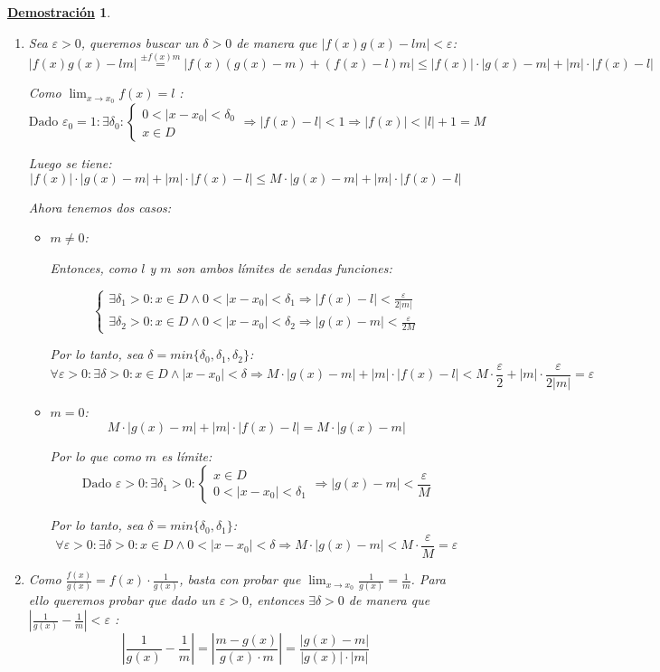 \documentclass[10pt,a4paper,openright]{book}
\theoremstyle{break}
\newtheorem*{demo}{\underline{Demostración}}
\begin{document}
\begin{demo}
\begin{enumerate}
\item Sea $\varepsilon>0$, queremos buscar un $\delta>0$ de manera que $|f(x)g(x)-lm|<\varepsilon$:
$$|f(x)g(x)-lm|\stackrel{\pm f(x)m}{=}|f(x)\left(g(x)-m\right)+\left(f(x)-l\right)m|\leq |f(x)|\cdot |g(x)-m|+|m|\cdot |f(x)-l|$$

Como $\lim_{x\rightarrow x_0}f(x)=l$ :
$$\mbox{Dado }\varepsilon_0=1: \exists \delta_0: \begin{cases} 0<|x-x_0|<\delta_0 \\ x\in D \end{cases}\Rightarrow |f(x)-l|<1\Rightarrow |f(x)|<|l|+1=M$$

Luego se tiene:
$$|f(x)|\cdot |g(x)-m|+|m|\cdot |f(x)-l|\leq M\cdot |g(x)-m|+|m|\cdot |f(x)-l|$$

Ahora tenemos dos casos:
\begin{itemize}
\item $m\neq 0$:\par
	Entonces, como $l$ y $m$ son ambos límites de sendas funciones:
	
$$\begin{cases} \exists \delta_1>0: x\in D\wedge 0<|x-x_0|<\delta_1 \Rightarrow |f(x)-l|<\frac{\varepsilon}{2|m|}\\ \exists \delta_2>0: x\in D\wedge 0<|x-x_0|<\delta_2\Rightarrow |g(x)-m|<\frac{\varepsilon}{2M}\end{cases}$$
	
	Por lo tanto, sea $\delta=min\{\delta_0,\delta_1,\delta_2\}$:
	$$\forall \varepsilon>0: \exists \delta>0: x\in D \wedge |x-x_0|<\delta\Rightarrow M\cdot |g(x)-m|+|m|\cdot |f(x)-l|<M\cdot \frac{\varepsilon}{2}+|m|\cdot \frac{\varepsilon}{2|m|}=\varepsilon$$
	
\item $m=0$:
$$M\cdot |g(x)-m|+|m|\cdot |f(x)-l|=M\cdot |g(x)-m|$$

Por lo que como $m$ es límite:
$$\mbox{Dado }\varepsilon>0: \exists \delta_1>0:\begin{cases} x\in D\\ 0<|x-x_0|<\delta_1\end{cases}\Rightarrow |g(x)-m|<\frac{\varepsilon}{M}$$

Por lo tanto, sea $\delta=min\{\delta_0, \delta_1\}$:
$$\forall \varepsilon>0: \exists \delta>0: x\in D\wedge 0<|x-x_0|<\delta\Rightarrow M\cdot |g(x)-m|< M\cdot \frac{\varepsilon}{M}=\varepsilon$$
\end{itemize}

\item Como $\frac{f(x)}{g(x)}=f(x)\cdot \frac{1}{g(x)}$, basta con probar que $\lim_{x\rightarrow x_0}\frac{1}{g(x)}=\frac{1}{m}$. Para ello queremos probar que dado un $\varepsilon>0$, entonces $\exists \delta>0$ de manera que $\left|\frac{1}{g(x)}-\frac{1}{m}\right|<\varepsilon$ :
$$\left|\frac{1}{g(x)}-\frac{1}{m}\right|=\left|\frac{m-g(x)}{g(x)\cdot m}\right|=\frac{|g(x)-m|}{|g(x)|\cdot |m|}$$


\end{enumerate}
\end{demo}
\end{document}
